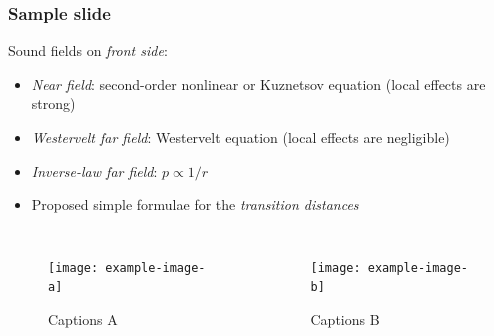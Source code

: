 \documentclass[9pt, mathserif, aspectratio=43]{beamer}
\begin{document}
\begin{frame}
    \frametitle{Sample slide}
    Sound fields on \emph{front side}:
    \begin{itemize}
        \item \emph{Near field}: second-order nonlinear or Kuznetsov equation (local effects are strong)
    \item \emph{Westervelt far field}: Westervelt equation (local effects are negligible)
    \item \emph{Inverse-law far field}: $p \propto 1/r$
        \item Proposed simple formulae for the \emph{transition distances}
        \end{itemize}
    \begin{columns}
        \begin{figure}[!htb]
        \centering
        \texttt{[image: example-image-a]}
        \caption{Captions A}
    \end{figure}
    \begin{figure}[!htb]
        \centering
        \texttt{[image: example-image-b]}
        \caption{Captions B}
    \end{figure}
    \end{columns}
\end{frame}
\end{document}
